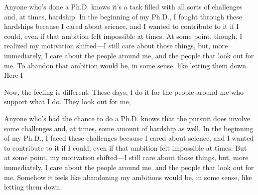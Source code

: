 Anyone who's done a Ph.D. knows it's a task filled with all sorts of challenges and, at times, hardship.
In the beginning of my Ph.D., I fought through these hardships because I cared about science, and I wanted to contribute to it if I could, even if that ambition felt impossible at times.
At some point, though, I realized my motivation shifted---I still care about those things, but, more immediately, I care about the people around me, and the people that look out for me.
To abandon that ambition would be, in some sense, like letting them down.
Here I 

Now, the feeling is different.
These days, I do it for the people around me who support what I do.
They look out for me, 


Anyone who's had the chance to do a Ph.D. knows that the pursuit does involve some challenges and, at times, some amount of hardship as well.
In the beginning of my Ph.D., I faced these challenges because I cared about science, and I wanted to contribute to it if I could, even if that ambition felt impossible at times.
But at some point, my motivation shifted---I still care about those things, but, more immediately, I care about the people around me, and the people that look out for me.
Somehow it feels like abandoning my ambitions would be, in some sense, like letting them down.



% 
% 
% 
% 
% 
